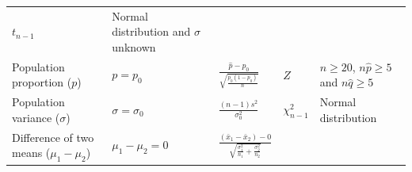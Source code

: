 \documentclass[]{book}
\begin{document}
\begin{landscape}
\begin{longtable}[]{@{}lllll@{}}
\begin{minipage}[t]{0.16\columnwidth}
\(t_{n-1}\)\strut
\end{minipage} & \begin{minipage}[t]{0.16\columnwidth}\raggedright
Normal distribution and \(\sigma\) unknown\strut
\end{minipage}\tabularnewline
\begin{minipage}[t]{0.19\columnwidth}\raggedright
Population proportion (\(p\))\strut
\end{minipage} & \begin{minipage}[t]{0.16\columnwidth}\raggedright
\(p=p_0\)\strut
\end{minipage} & \begin{minipage}[t]{0.19\columnwidth}\raggedright
\(\frac{\hat{p} -p_{0}}{\sqrt{\frac{p_{0}(1-p_0)}{n}}}\)\strut
\end{minipage} & \begin{minipage}[t]{0.16\columnwidth}\raggedright
\(Z\)\strut
\end{minipage} & \begin{minipage}[t]{0.16\columnwidth}\raggedright
\(n\geq20\), \(n\hat{p} \geq 5\) and \(n\hat{q}\geq 5\)\strut
\end{minipage}\tabularnewline
\begin{minipage}[t]{0.19\columnwidth}\raggedright
Population variance (\(\sigma\))\strut
\end{minipage} & \begin{minipage}[t]{0.16\columnwidth}\raggedright
\(\sigma=\sigma_0\)\strut
\end{minipage} & \begin{minipage}[t]{0.19\columnwidth}\raggedright
\(\frac{(n-1)s^2}{\sigma_0^2}\)\strut
\end{minipage} & \begin{minipage}[t]{0.16\columnwidth}\raggedright
\(\chi^2_{n-1}\)\strut
\end{minipage} & \begin{minipage}[t]{0.16\columnwidth}\raggedright
Normal distribution\strut
\end{minipage}\tabularnewline
\begin{minipage}[t]{0.19\columnwidth}\raggedright
Difference of two means (\(\mu_1-\mu_2\))\strut
\end{minipage} & \begin{minipage}[t]{0.16\columnwidth}\raggedright
\(\mu_1-\mu_2=0\)\strut
\end{minipage} & \begin{minipage}[t]{0.19\columnwidth}\raggedright
\(\frac{(\bar{x}_1-\bar{x}_2) -0}{\sqrt{\frac{\sigma^2_1}{n_1}+\frac{\sigma_2^2}{n_2}}}\)\strut

\end{minipage}
\end{longtable}
\end{landscape}
\end{document}
